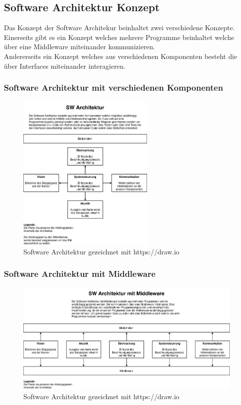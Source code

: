 \documentclass[../../main.tex]{subfiles}
\begin{document}
\subsection{Software Architektur Konzept}
Das Konzept der Software Architekur beinhaltet zwei verschiedene Konzepte.
Einerseits gibt es ein Konzept welches mehrere Programme beinhaltet welche über eine Middleware miteinander kommunizieren. \\
Andererseits ein Konzept welches aus verschiedenen Komponenten besteht die über Interfaces miteinander interagieren. \\

\subsubsection{Software Architektur mit verschiedenen Komponenten}
\begin{figure}[H] %
    \centering
    \includegraphics[width=0.6\textwidth]{../../drawings/ArchitekturDiagramm/SW_Architektur.png}
    \caption {Software Architektur gezeichnet mit https://draw.io}
\end{figure}

\subsubsection{Software Architektur mit Middleware}
\begin{figure}[H] %
    \centering
    \includegraphics[width=1.0\textwidth]{../../drawings/ArchitekturDiagramm/SW_Architektur_Middleware.png}
    \caption {Software Architektur gezeichnet mit https://draw.io}
\end{figure}
\end{document}
